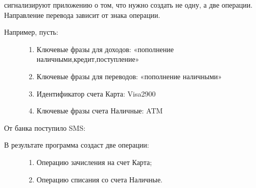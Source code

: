 \documentclass[a4paper,10pt,russian]{sphinxmanual}
\begin{document}
 сигнализируют приложению о том, что нужно создать не одну, а две операции. Направление
перевода зависит от знака операции.
\begin{description}
\item[{Например, пусть:}] \leavevmode\begin{enumerate}
\def\theenumi{\arabic{enumi}}
\def\labelenumi{\theenumi .}
\makeatletter\def\p@enumii{\p@enumi \theenumi .}\makeatother
\item {} 
Ключевые фразы для доходов: «пополнение наличными,кредит,поступление»

\item {} 
Ключевые фразы для переводов: «пополнение наличными»

\item {} 
Идентификатор счета Карта: Visa2900

\item {} 
Ключевые фразы счета Наличные: ATM

\end{enumerate}

\end{description}

От банка поступило SMS:

\begin{sphinxVerbatim}[commandchars=\\\{\}]
         
\end{sphinxVerbatim}
\begin{description}
\item[{В результате программа создаст две операции:}] \leavevmode\begin{enumerate}
\def\theenumi{\arabic{enumi}}
\def\labelenumi{\theenumi .}
\makeatletter\def\p@enumii{\p@enumi \theenumi .}\makeatother
\item {} 
Операцию зачисления на счет Карта;

\item {} 
Операцию списания со счета Наличные.

\end{enumerate}

\end{description}
\end{document}
